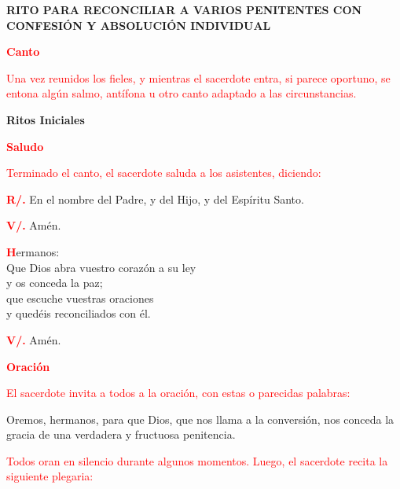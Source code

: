 \documentclass[12pt, letterpaper]{report}
\begin{document}

\begin{center}
\Huge {\bfseries RITO PARA RECONCILIAR A VARIOS PENITENTES CON
CONFESI\'ON Y ABSOLUCI\'ON INDIVIDUAL}
\end{center}

\Large {\bfseries \textcolor{red}{Canto}}

\large {\textcolor{red}{ Una vez reunidos los fieles, y mientras el sacerdote entra, si parece oportuno, se entona alg\'un salmo, ant\'ifona u otro canto adaptado a las circunstancias.}}

\begin{center}
\Huge {\bfseries Ritos Iniciales}
\end{center}

\Large {\bfseries \textcolor{red}{Saludo}}

\large {\textcolor{red}{ Terminado el canto, el sacerdote saluda a los asistentes, diciendo:}}

\noindent
\Large {\bfseries \textcolor{red}{R/.}} \hspace{1cm} {En el nombre del Padre, y del Hijo, y del Esp\'iritu Santo.}

\noindent
\Large{{\bfseries \textcolor{red}{V/.}} \hspace{1cm} Am\'en.}

\noindent
\lettrine[lines=2]{\bfseries \textcolor{red}{H}}{}\Large {ermanos:}\\
\Large {Que Dios abra vuestro coraz\'on a su ley \\
y os conceda la paz; \\
que escuche vuestras oraciones \\
y qued\'eis reconciliados con \'el.}

\noindent
{\bfseries \textcolor{red}{V/.}} \hspace{1cm} \Large Am\'en.

\Large {\bfseries \textcolor{red}{Oraci\'on}}

\large {\textcolor{red}{El sacerdote invita a todos a la oraci\'on, con estas o parecidas palabras:}}

\Large {Oremos, hermanos, para que Dios, que nos llama a la conversi\'on, nos conceda la gracia de una verdadera y fructuosa penitencia.}

\large {\textcolor{red}{Todos oran en silencio durante algunos momentos. Luego, el sacerdote recita la siguiente plegaria:}}
\end{document}
